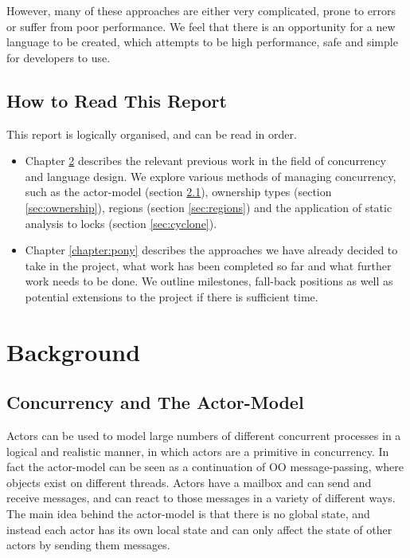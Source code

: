 \documentclass[pdftex,11pt,a4paper]{report}
\begin{document}
However, many of these approaches are either very complicated, prone to errors or suffer from poor performance.
We feel that there is an opportunity for a new language to be created, which attempts to be high performance, safe and simple for developers to use.

\section{How to Read This Report}

This report is logically organised, and can be read in order.
\begin{itemize}
\item Chapter \ref{chapter:background} describes the relevant previous work in the field of concurrency and language design.
	We explore various methods of managing concurrency, such as the actor-model (section \ref{sec:actor}), ownership types (section \ref{sec:ownership}), regions (section \ref{sec:regions}) and the application of static analysis to locks (section \ref{sec:cyclone}).
\item Chapter \ref{chapter:pony} describes the approaches we have already decided to take in the project, what work has been completed so far and what further work needs to be done.
	We outline milestones, fall-back positions as well as potential extensions to the project if there is sufficient time.
\end{itemize}

\newpage
\chapter{Background}
\label{chapter:background}

\section{Concurrency and The Actor-Model}
\label{sec:actor}

Actors can be used to model large numbers of different concurrent processes in a logical and realistic manner, in which actors are a primitive in concurrency.
In fact the actor-model can be seen as a continuation of OO message-passing, where objects exist on different threads.
Actors have a mailbox and can send and receive messages, and can react to those messages in a variety of different ways.
The main idea behind the actor-model is that there is no global state, and instead each actor has its own local state and can only affect the state of other actors by sending them messages.
\end{document}
